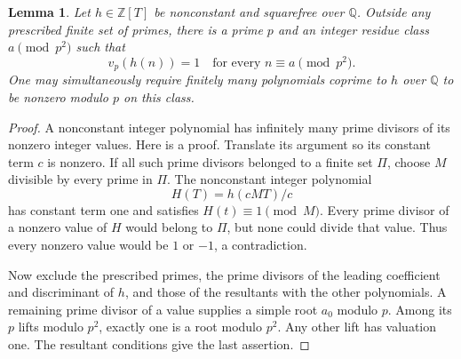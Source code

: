 \documentclass[11pt]{article}
\newtheorem{lemma}[theorem]{Lemma}
\theoremstyle{definition}
\begin{document}
\begin{lemma}\label{lem:simple-prime-values}
Let $h\in\mathbb Z[T]$ be nonconstant and squarefree over $\mathbb Q$.
Outside any prescribed finite set of primes, there is a prime $p$ and
an integer residue class $a\pmod{p^2}$ such that
\[
                        v_p(h(n))=1
              \quad\text{for every }n\equiv a\pmod{p^2}.
\]
One may simultaneously require finitely many polynomials coprime to
$h$ over $\mathbb Q$ to be nonzero modulo $p$ on this class.
\end{lemma}
\begin{proof}
A nonconstant integer polynomial has infinitely many prime divisors
of its nonzero integer values.  Here is a proof.  Translate its
argument so its constant term $c$ is nonzero.  If all such prime
divisors belonged to a finite set $\Pi$, choose $M$ divisible by
every prime in $\Pi$.  The nonconstant integer polynomial
\[
                         H(T)=h(cMT)/c
\]
has constant term one and satisfies $H(t)\equiv1\pmod M$.
Every prime divisor of a nonzero value of $H$ would belong to $\Pi$,
but none could divide that value.  Thus every nonzero value would
be $1$ or $-1$, a contradiction.

Now exclude the prescribed primes, the prime divisors of the leading
coefficient and discriminant of $h$, and those of the resultants with
the other polynomials.  A remaining prime divisor of a value supplies
a simple root $a_0$ modulo $p$.  Among its $p$ lifts modulo $p^2$,
exactly one is a root modulo $p^2$.  Any other lift has valuation one.
The resultant conditions give the last assertion.
\end{proof}
\end{document}
